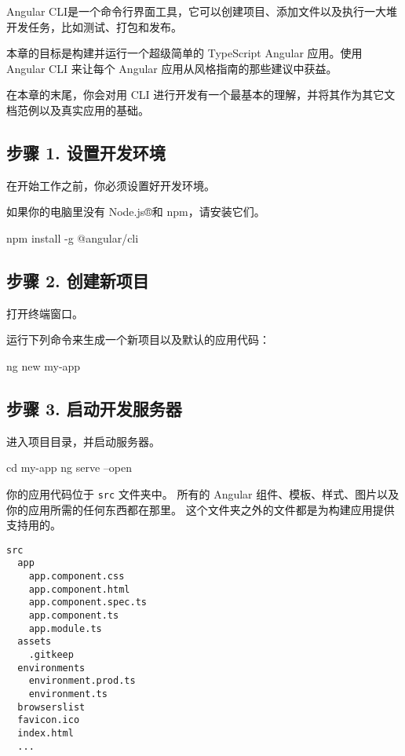 \documentclass{codedump}
\begin{document}
Angular CLI是一个命令行界面工具，它可以创建项目、添加文件以及执行一大堆开发任务，比如测试、打包和发布。

本章的目标是构建并运行一个超级简单的 TypeScript Angular 应用。使用 Angular CLI 来让每个 Angular 应用从风格指南的那些建议中获益。

在本章的末尾，你会对用 CLI 进行开发有一个最基本的理解，并将其作为其它文档范例以及真实应用的基础。

\subsection{步骤 1. 设置开发环境}

在开始工作之前，你必须设置好开发环境。

如果你的电脑里没有 Node.js®和 npm，请安装它们。

\begin{invertedShellBox}
npm install -g @angular/cli
\end{invertedShellBox}

\subsection{步骤 2. 创建新项目}

打开终端窗口。

运行下列命令来生成一个新项目以及默认的应用代码：

\begin{invertedShellBox}
ng new my-app
\end{invertedShellBox}

\subsection{步骤 3. 启动开发服务器}

进入项目目录，并启动服务器。

\begin{invertedShellBox}
cd my-app
ng serve --open
\end{invertedShellBox}

你的应用代码位于 \verb|src| 文件夹中。 所有的 Angular 组件、模板、样式、图片以及你的应用所需的任何东西都在那里。 这个文件夹之外的文件都是为构建应用提供支持用的。

\begin{lstlisting}[style=bashOutputStyle]
src
  app
    app.component.css
    app.component.html
    app.component.spec.ts
    app.component.ts
    app.module.ts
  assets
    .gitkeep
  environments
    environment.prod.ts
    environment.ts
  browserslist
  favicon.ico
  index.html
  ...
\end{lstlisting}
\end{document}

